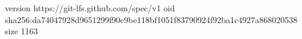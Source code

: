 version https://git-lfs.github.com/spec/v1
oid sha256:da74047928d9651299f90c9be118bf1051f83790924f92ba1c4927a868020538
size 1163

